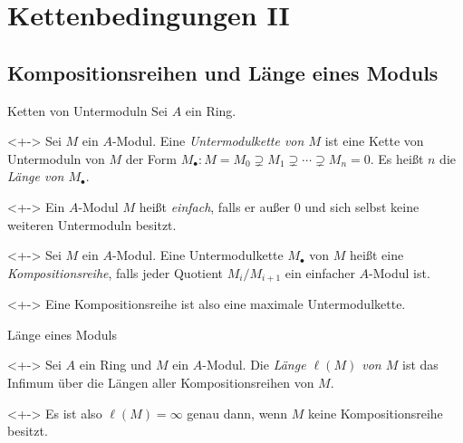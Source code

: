 \section{Kettenbedingungen II}

\subsection{Kompositionsreihen und Länge eines Moduls}

\begin{frame}{Ketten von Untermoduln}
	Sei \(A\) ein Ring.
	\begin{definition}<+->
		Sei \(M\) ein \(A\)-Modul. Eine \emph{Untermodulkette von
		\(M\)} ist eine Kette von Untermoduln von \(M\) der Form
		\(M_\bullet\colon M = M_0 \supsetneq M_1 \supsetneq \dotsb \supsetneq M_n = 0\).
		Es heißt \(n\) die \emph{Länge von \(M_\bullet\)}.
	\end{definition}
	\begin{definition}<+->
		Ein \(A\)-Modul \(M\) heißt \emph{einfach}, falls er außer \(0\) und
		sich selbst keine weiteren Untermoduln besitzt.
	\end{definition}
	\begin{definition}<+->
		Sei \(M\) ein \(A\)-Modul. Eine Untermodulkette \(M_\bullet\) von \(M\)
		heißt eine \emph{Kompositionsreihe}, falls jeder Quotient
		\(M_i/M_{i + 1}\) ein einfacher \(A\)-Modul ist.
	\end{definition}
	\begin{visibleenv}<+->
		Eine Kompositionsreihe ist also eine maximale Untermodulkette.
	\end{visibleenv}
\end{frame}

\begin{frame}{Länge eines Moduls}
	\begin{definition}<+->
		Sei \(A\) ein Ring und \(M\) ein \(A\)-Modul.
		Die \emph{Länge \(\ell(M)\) von \(M\)} ist das Infimum über die Längen aller
		Kompositionsreihen von \(M\).
	\end{definition}
	\begin{visibleenv}<+->
		Es ist also \(\ell(M) = \infty\) genau dann, wenn \(M\) keine Kompositionsreihe
		besitzt.
	\end{visibleenv}
\end{frame}

